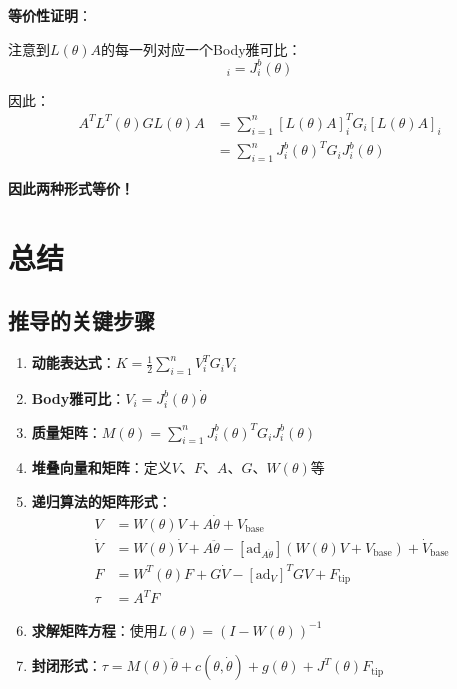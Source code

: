 \documentclass[12pt,a4paper]{article}
\begin{document}
\textbf{等价性证明}：

注意到$L(\theta)A$的每一列对应一个Body雅可比：
\begin{equation}
[L(\theta)A]_i = J_i^b(\theta)
\end{equation}

因此：
\begin{align}
A^T L^T(\theta)GL(\theta)A &= \sum_{i=1}^{n} [L(\theta)A]_i^T G_i [L(\theta)A]_i \\
&= \sum_{i=1}^{n} J_i^b(\theta)^T G_i J_i^b(\theta)
\end{align}

\textbf{因此两种形式等价！}

\section{总结}

\subsection{推导的关键步骤}

\begin{enumerate}
\item \textbf{动能表达式}：$K = \frac{1}{2}\sum_{i=1}^{n} V_i^T G_i V_i$

\item \textbf{Body雅可比}：$V_i = J_i^b(\theta) \dot{\theta}$

\item \textbf{质量矩阵}：$M(\theta) = \sum_{i=1}^{n} J_i^b(\theta)^T G_i J_i^b(\theta)$

\item \textbf{堆叠向量和矩阵}：定义$V$、$F$、$A$、$G$、$W(\theta)$等

\item \textbf{递归算法的矩阵形式}：
\begin{align}
V &= W(\theta)V + A\dot{\theta} + V_{\text{base}} \\
\dot{V} &= W(\theta)\dot{V} + A\ddot{\theta} - [\text{ad}_{A\dot{\theta}}](W(\theta)V + V_{\text{base}}) + \dot{V}_{\text{base}} \\
F &= W^T(\theta)F + G\dot{V} - [\text{ad}_V]^T GV + F_{\text{tip}} \\
\tau &= A^T F
\end{align}

\item \textbf{求解矩阵方程}：使用$L(\theta) = (I - W(\theta))^{-1}$

\item \textbf{封闭形式}：$\tau = M(\theta)\ddot{\theta} + c(\theta, \dot{\theta}) + g(\theta) + J^T(\theta)F_{\text{tip}}$
\end{enumerate}
\end{document}
